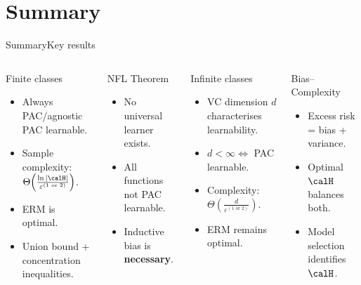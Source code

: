 \section{Summary}

\begin{frame}{Summary}{Key results}
  \begin{columns}[T]
    \begin{block}{Finite classes}
      \begin{itemize}
        \item Always PAC/agnostic PAC learnable.
        \item Sample complexity: $\Theta\!\left(\tfrac{\ln|\calH|}{\varepsilon^{(1\text{ or }2)}}\right)$.
        \item ERM is optimal.
        \item Union bound + concentration inequalities.
      \end{itemize}
    \end{block}
    \bigskip
    \begin{block}{NFL Theorem}
      \begin{itemize}
        \item No universal learner exists.
        \item All functions not PAC learnable.
        \item Inductive bias is \textbf{necessary}.
      \end{itemize}
    \end{block}
    \begin{block}{Infinite classes}
      \begin{itemize}
        \item VC dimension $d$ characterises learnability.
        \item $d < \infty \Leftrightarrow$ PAC learnable.
        \item Complexity: $\Theta\!\left(\tfrac{d}{\varepsilon^{(1\text{ or }2)}}\right)$.
        \item ERM remains optimal.
      \end{itemize}
    \end{block}
    \bigskip
    \begin{block}{Bias–Complexity}
      \begin{itemize}
        \item Excess risk = bias + variance.
        \item Optimal $\calH$ balances both.
        \item Model selection identifies $\calH$.
      \end{itemize}
    \end{block}
  \end{columns}
\end{frame}

